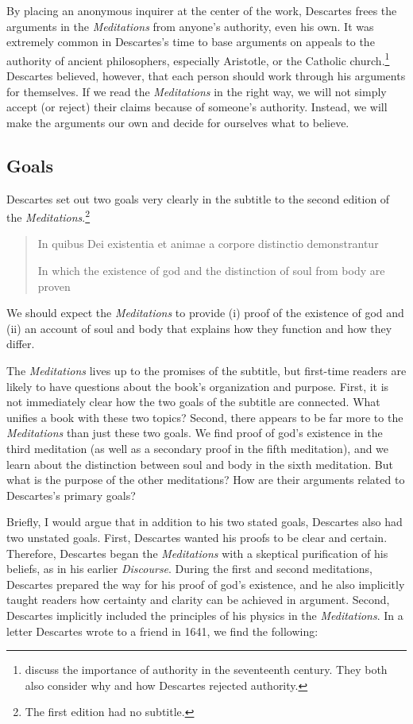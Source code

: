 By placing an anonymous inquirer at the center of the work, Descartes frees the arguments in the \textit{Meditations} from anyone's authority, even his own. It was extremely common in Descartes's time to base arguments on appeals to the authority of ancient philosophers, especially Aristotle, or the Catholic church.\footnote{\textcites[4--7]{cottingham1986}[4--5]{garber1998} discuss the importance of authority in the seventeenth century. They both also consider why and how Descartes rejected authority.} Descartes believed, however, that each person should work through his arguments for themselves. If we read the \textit{Meditations} in the right way, we will not simply accept (or reject) their claims because of someone's authority. Instead, we will make the arguments our own and decide for ourselves what to believe.

\subsection*{Goals}

Descartes set out two goals very clearly in the subtitle to the second edition of the \textit{Meditations}.\footnote{The first edition had no subtitle.}

\begin{quote}
    In quibus Dei existentia et animae a corpore distinctio demonstrantur

    In which the existence of god and the distinction of soul from body are proven
\end{quote}
We should expect the \textit{Meditations} to provide (i) proof of the existence of god and (ii) an account of soul and body that explains how they function and how they differ.

The \textit{Meditations} lives up to the promises of the subtitle, but first-time readers are likely to have questions about the book's organization and purpose. First, it is not immediately clear how the two goals of the subtitle are connected. What unifies a book with these two topics? Second, there appears to be far more to the \textit{Meditations} than just these two goals. We find proof of god's existence in the third meditation (as well as a secondary proof in the fifth meditation), and we learn about the distinction between soul and body in the sixth meditation. But what is the purpose of the other meditations? How are their arguments related to Descartes's primary goals?

Briefly, I would argue that in addition to his two stated goals, Descartes also had two unstated goals. First, Descartes wanted his proofs to be clear and certain. Therefore, Descartes began the \textit{Meditations} with a skeptical purification of his beliefs, as in his earlier \textit{Discourse}. During the first and second meditations, Descartes prepared the way for his proof of god's existence, and he also implicitly taught readers how certainty and clarity can be achieved in argument. Second, Descartes implicitly included the principles of his physics in the \textit{Meditations}. In a letter Descartes wrote to a friend in 1641, we find the following:

